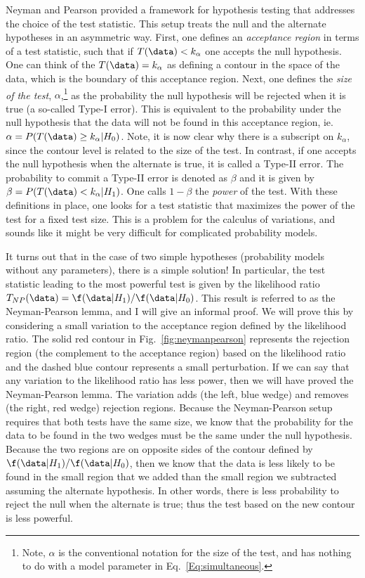 Neyman and Pearson provided a framework for hypothesis testing that addresses the choice of the test statistic.  This setup treats the null and the alternate hypotheses in an asymmetric way.  First, one defines an \textit{acceptance region} in terms of a test statistic, such that if $T(\data)< k_\alpha$ one accepts the null hypothesis.  One can think of the $T(\data) = k_\alpha$ as defining a contour in the space of the data, which is the boundary of this acceptance region.  Next, one defines the \textit{size of the test}, $\alpha$,\footnote{Note, $\alpha$ is the conventional notation for the size of the test, and has nothing to do with a model parameter in Eq.~\ref{Eq:simultaneous}.} as the probability the null hypothesis will be rejected when it is true (a so-called Type-I error).  This is equivalent to the probability under the null hypothesis that the data will not be found in this acceptance region, ie. $\alpha = P(T(\data) \ge k_\alpha | H_0)$.  Note, it is now clear why there is a subscript on $k_\alpha$, since the contour level is related to the size of the test.  In contrast, if one accepts the null hypothesis when the alternate is true, it is called a Type-II error.  The probability to commit a Type-II error is denoted as $\beta$ and it is given by $\beta=P(T(\data) < k_\alpha|H_1)$.  One calls $1-\beta$ the \textit{power} of the test.  With these definitions in place, one looks for a test statistic that maximizes the power of the test for a fixed test size.  This is a problem for the calculus of variations, and sounds like it might be very difficult for complicated probability models. 


It turns out that in the case of two simple hypotheses (probability models without any parameters), there is a simple solution!  In particular, the test statistic leading to the most powerful test is given by the likelihood ratio $T_{NP}(\data) = \f(\data|H_1)/\f(\data|H_0)$.  This result is referred to as the Neyman-Pearson lemma, and I will give an informal proof.  We will prove this by considering a small variation to the acceptance region defined by the likelihood ratio.  The solid red contour in Fig.~\ref{fig:neymanpearson} represents the rejection region (the complement to the acceptance region) based on the likelihood ratio and the dashed blue contour represents a small perturbation.  If we can say that any variation to the likelihood ratio has less power, then we will have proved the Neyman-Pearson lemma.  The variation adds (the left, blue wedge) and removes (the right, red wedge) rejection regions.  Because the Neyman-Pearson setup requires that both tests have the same size, we know that the probability for the data to be found in the two wedges must be the same under the null hypothesis.  Because the two regions are on opposite sides of the contour defined by $ \f(\data|H_1)/\f(\data|H_0)$, then we know that the data is less likely to be found in the small region that we added than the small region we subtracted assuming the alternate hypothesis.  In other words, there is less probability to reject the null when the alternate is true; thus the  test based on the new contour is less powerful.
